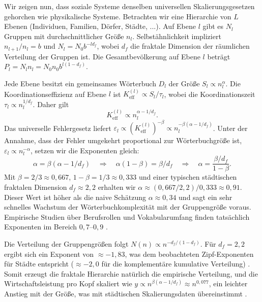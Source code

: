 \documentclass[11pt]{article}
\theoremstyle{remark}
\newcommand{\Keff}{K_{\mathrm{eff}}}
\begin{document}
	Wir zeigen nun, dass soziale Systeme denselben universellen Skalierungsgesetzen gehorchen wie physikalische Systeme. Betrachten wir eine Hierarchie von \(L\) Ebenen (Individuen, Familien, Dörfer, Städte, ...). Auf Ebene \(l\) gibt es \(N_l\) Gruppen mit durchschnittlicher Größe \(n_l\). Selbstähnlichkeit impliziert \(n_{l+1}/n_l = b\) und \(N_l = N_0 b^{-l d_f}\), wobei \(d_f\) die fraktale Dimension der räumlichen Verteilung der Gruppen ist. Die Gesamtbevölkerung auf Ebene \(l\) beträgt \(P_l = N_l n_l = N_0 n_0 b^{l(1-d_f)}\).
	
	Jede Ebene besitzt ein gemeinsames Wörterbuch \(D_l\) der Größe \(S_l \propto n_l^{\alpha}\). Die Koordinationseffizienz auf Ebene \(l\) ist \(\Keff^{(l)} \propto S_l / \tau_l\), wobei die Koordinationszeit \(\tau_l \propto n_l^{1/d_f}\). Daher gilt
	\begin{equation}
		\Keff^{(l)} \propto n_l^{\alpha - 1/d_f}. \tag{1}
	\end{equation}
	Das universelle Fehlergesetz liefert \(\varepsilon_l \propto (\Keff^{(l)})^{-\beta} \propto n_l^{-\beta(\alpha - 1/d_f)}\). Unter der Annahme, dass der Fehler umgekehrt proportional zur Wörterbuchgröße ist, \(\varepsilon_l \propto n_l^{-\alpha}\), setzen wir die Exponenten gleich:
	\begin{equation}
		\alpha = \beta(\alpha - 1/d_f) \quad\Longrightarrow\quad \alpha(1-\beta) = \beta / d_f \quad\Longrightarrow\quad \alpha = \frac{\beta / d_f}{1-\beta}.
	\end{equation}
	Mit \(\beta = 2/3 \approx 0,667\), \(1-\beta = 1/3 \approx 0,333\) und einer typischen städtischen fraktalen Dimension \(d_f \approx 2,2\) erhalten wir \(\alpha \approx (0,667/2,2)/0,333 \approx 0,91\). Dieser Wert ist höher als die naive Schätzung \(\alpha \approx 0,34\) und sagt ein sehr schnelles Wachstum der Wörterbuchkomplexität mit der Gruppengröße voraus. Empirische Studien über Berufsrollen und Vokabularumfang finden tatsächlich Exponenten im Bereich \(0,7\)–\(0,9\) \cite{Bettencourt2007, Molinero2024}.
	
	Die Verteilung der Gruppengrößen folgt \(N(n) \propto n^{-d_f/(1-d_f)}\). Für \(d_f = 2,2\) ergibt sich ein Exponent von \(\approx -1,83\), was dem beobachteten Zipf-Exponenten für Städte entspricht (\(\approx -2,0\) für die komplementäre kumulative Verteilung) \cite{Fluschnik2016, Rybski2023}. Somit erzeugt die fraktale Hierarchie natürlich die empirische Verteilung, und die Wirtschaftsleistung pro Kopf skaliert wie \(y \propto n^{\beta(\alpha - 1/d_f)} \approx n^{0,077}\), ein leichter Anstieg mit der Größe, was mit städtischen Skalierungsdaten übereinstimmt \cite{Bettencourt2007}.
	
\end{document}
